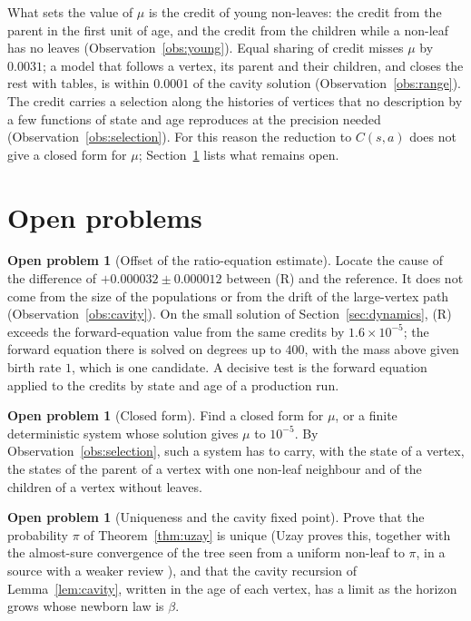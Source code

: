 \documentclass[11pt]{article}
\theoremstyle{plain}
\theoremstyle{definition}
\newtheorem{openproblem}[theorem]{Open problem}
\theoremstyle{remark}
\begin{document}
What sets the value of $\mu$ is the credit of young non-leaves: the credit from the parent in the first unit of age, and the credit from the children while a non-leaf has no leaves (Observation~\ref{obs:young}). Equal sharing of credit misses $\mu$ by $0.0031$; a model that follows a vertex, its parent and their children, and closes the rest with tables, is within $0.0001$ of the cavity solution (Observation~\ref{obs:range}). The credit carries a selection along the histories of vertices that no description by a few functions of state and age reproduces at the precision needed (Observation~\ref{obs:selection}). For this reason the reduction to $C(s,a)$ does not give a closed form for $\mu$; Section~\ref{sec:open} lists what remains open.

\section{Open problems}\label{sec:open}

\begin{openproblem}[Offset of the ratio-equation estimate]\label{op:offset}
Locate the cause of the difference of $+0.000032\pm0.000012$ between (R) and the reference. It does not come from the size of the populations or from the drift of the large-vertex path (Observation~\ref{obs:cavity}). On the small solution of Section~\ref{sec:dynamics}, (R) exceeds the forward-equation value from the same credits by $1.6\times10^{-5}$; the forward equation there is solved on degrees up to $400$, with the mass above given birth rate $1$, which is one candidate. A decisive test is the forward equation applied to the credits by state and age of a production run.
\end{openproblem}

\begin{openproblem}[Closed form]\label{op:formula}
Find a closed form for $\mu$, or a finite deterministic system whose solution gives $\mu$ to $10^{-5}$. By Observation~\ref{obs:selection}, such a system has to carry, with the state of a vertex, the states of the parent of a vertex with one non-leaf neighbour and of the children of a vertex without leaves.
\end{openproblem}

\begin{openproblem}[Uniqueness and the cavity fixed point]\label{op:cohort}
Prove that the probability $\pi$ of Theorem~\ref{thm:uzay} is unique (Uzay proves this, together with the almost-sure convergence of the tree seen from a uniform non-leaf to $\pi$, in a source with a weaker review \cite[round2, \texttt{fringe/spatial-limit.md}]{UzayR3}), and that the cavity recursion of Lemma~\ref{lem:cavity}, written in the age of each vertex, has a limit as the horizon grows whose newborn law is $\beta$.
\end{openproblem}
\end{document}
